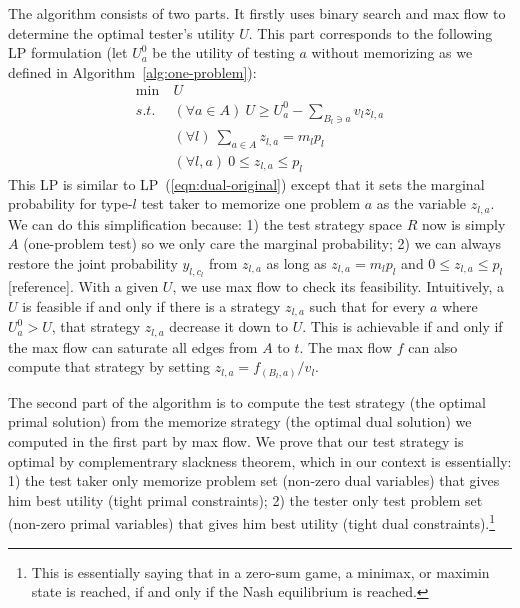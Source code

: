 \documentclass{article}
\begin{document}
The algorithm consists of two parts. It firstly uses binary search and max flow
to determine the optimal tester's utility $U$.  This part corresponds to the following
LP formulation (let $U^0_a$ be the utility of testing $a$ without memorizing as we defined
in Algorithm~\ref{alg:one-problem}):
\begin{align}
	\min~ &U\\
	s.t.~ &(\forall a \in A)~ U \geq U^0_a - \sum_{B_l \ni a} v_l z_{l, a}\nonumber\\
	&(\forall l)~ \sum_{a \in A} z_{l, a} = m_l p_l\nonumber\\
	&(\forall l, a)~ 0 \leq z_{l, a} \leq p_l\nonumber
\end{align}
This LP is similar to LP~(\ref{eqn:dual-original}) except that it sets the
marginal probability for type-$l$ test taker to memorize one problem $a$ as the
variable $z_{l, a}$.
We can do this simplification because: 1) the test strategy space $R$ now is
simply $A$ (one-problem test) so we only care the marginal probability; 2) we
can always restore the joint probability $y_{l, c_l}$ from $z_{l, a}$ as long
as $z_{l, a} = m_l p_l$ and $0 \leq z_{l, a} \leq p_l$ [reference]. With a
given $U$, we use max flow to check its feasibility. Intuitively, a $U$ is
feasible if and only if there is a strategy $z_{l, a}$ such that for every $a$
where $U^0_a > U$, that strategy $z_{l, a}$ decrease it down to $U$. This is achievable
if and only if the max flow can saturate all edges from $A$ to $t$. The max flow
$f$ can also compute that strategy by setting $z_{l, a} = f_{(B_l, a)}/v_l$.

The second part of the algorithm is to compute the test strategy (the optimal
primal solution) from the memorize strategy (the optimal dual solution) we
computed in the first part by max flow. We prove that our test strategy is
optimal by complementrary slackness theorem, which in our context is
essentially: 1) the test taker only memorize problem set (non-zero dual
variables) that gives him best utility (tight primal constraints); 2) the
tester only test problem set (non-zero primal variables) that gives him best
utility (tight dual constraints).\footnote{This is essentially saying that in a
zero-sum game, a minimax, or maximin state is reached, if and only if the Nash
equilibrium is reached.}
\end{document}
